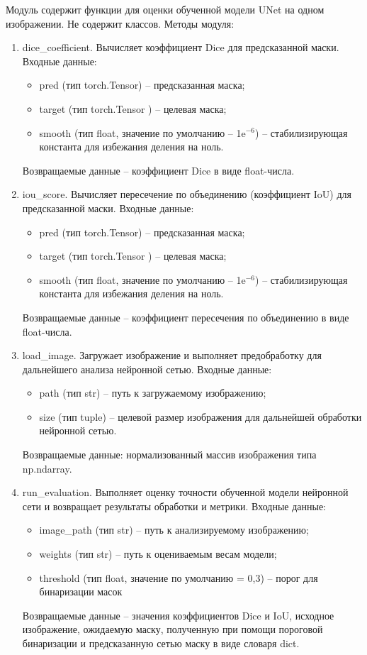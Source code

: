 Модуль содержит функции для оценки обученной модели UNet на одном изображении.  Не содержит классов. Методы модуля:
\begin{enumerate}
	\item dice\_coefficient. Вычисляет коэффициент Dice для предсказанной маски. Входные данные:
	\begin{itemize}
		\item pred (тип torch.Tensor) -- предсказанная маска;
		\item target (тип torch.Tensor ) -- целевая маска;
		\item smooth (тип float,  значение по умолчанию -- 1e$^{-6} $) -- стабилизирующая константа для избежания деления на ноль.
	\end{itemize}
	Возвращаемые данные -- коэффициент Dice в виде float-числа.
	\item iou\_score. Вычисляет пересечение по объединению (коэффициент IoU) для предсказанной маски. Входные данные:
	\begin{itemize}
		\item pred (тип torch.Tensor) -- предсказанная маска;
		\item target (тип torch.Tensor ) -- целевая маска;
		\item smooth (тип float,  значение по умолчанию -- 1e$^{-6} $) -- стабилизирующая константа для избежания деления на ноль.
	\end{itemize}
	Возвращаемые данные -- коэффициент пересечения по объединению в виде float-числа.
	\item load\_image. Загружает изображение и выполняет предобработку для дальнейшего анализа нейронной сетью. Входные данные:
	\begin{itemize}
		\item path (тип str) -- путь к загружаемому изображению;
		\item size (тип tuple) -- целевой размер изображения для дальнейшей обработки нейронной сетью.
	\end{itemize}
	Возвращаемые данные: нормализованный массив изображения типа np.ndarray.
	\item run\_evaluation. Выполняет оценку точности обученной модели нейронной сети и возвращает результаты обработки и метрики. Входные данные:
	\begin{itemize}
		\item image\_path (тип str) -- путь к анализируемому изображению;
		\item weights (тип str) -- путь к оцениваемым весам модели;
		\item threshold (тип float, значение по умолчанию = 0,3) -- порог для бинаризации масок
	\end{itemize}
	Возвращаемые данные -- значения коэффициентов Dice и IoU, исходное изображение, ожидаемую маску, полученную при помощи пороговой бинаризации и предсказанную сетью маску в виде словаря dict.
\end{enumerate}

